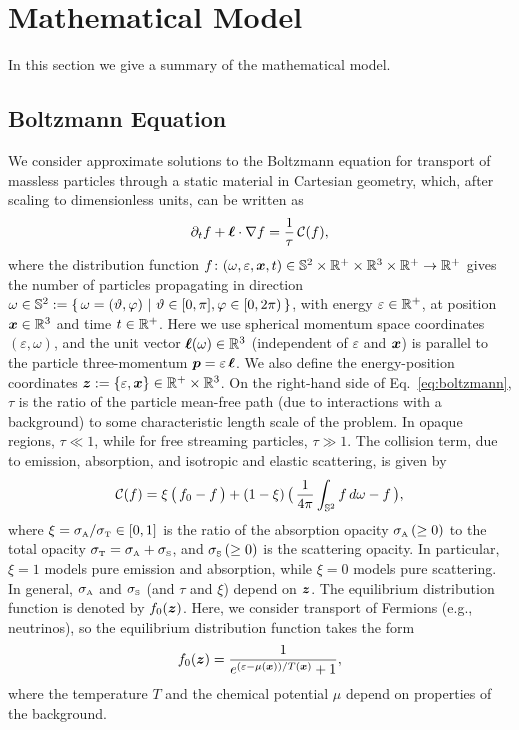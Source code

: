 \section{Mathematical Model}

In this section we give a summary of the mathematical model.  

\subsection{Boltzmann Equation}

We consider approximate solutions to the Boltzmann equation for transport of massless particles through a static material in Cartesian geometry, which, after scaling to dimensionless units, can be written as
\begin{equation}
  \pd{f}{t}+\vect{\ell}\cdot\nabla f
  =\f{1}{\tau}\,\cC(f),
  \label{eq:boltzmann}
\end{equation}
where the distribution function $f\colon(\omega,\varepsilon,\boldsymbol{x},t)\in\mathbb{S}^{2}\times\mathbb{R}^{+}\times\mathbb{R}^{3}\times\mathbb{R}^{+}\to\mathbb{R}^{+}$ gives the number of particles propagating in direction $\omega\in\mathbb{S}^{2}:=\{\,\omega=(\vartheta,\varphi)~|~\vartheta\in[0,\pi],\varphi\in[0,2\pi)\,\}$, with energy $\varepsilon\in\mathbb{R}^{+}$, at position $\boldsymbol{x}\in\mathbb{R}^{3}$ and time $t\in\mathbb{R}^{+}$.  
Here we use spherical momentum space coordinates $(\varepsilon,\omega)$, and the unit vector $\boldsymbol{\ell}(\omega)\in\mathbb{R}^{3}$ (independent of $\varepsilon$ and $\boldsymbol{x}$) is parallel to the particle three-momentum $\boldsymbol{p}=\varepsilon\,\boldsymbol{\ell}$.  
We also define the energy-position coordinates $\boldsymbol{z}:=\{\varepsilon,\boldsymbol{x}\}\in\mathbb{R}^{+}\times\mathbb{R}^{3}$.  
On the right-hand side of Eq.~\eqref{eq:boltzmann}, $\tau$ is the ratio of the particle mean-free path (due to interactions with a background) to some characteristic length scale of the problem.  
In opaque regions, $\tau\ll1$, while for free streaming particles, $\tau\gg1$.  
The collision term, due to emission, absorption, and isotropic and elastic scattering, is given by
\begin{equation}
  \cC(f)=\xi\,\big(\,f_{0}-f\,\big)
  +(1-\xi)\,\big(\,\f{1}{4\pi}\int_{\bbS^{2}}f\,d\omega-f\,\big),
  \label{eq:collisionTerm}
\end{equation}
where $\xi=\sigma_{\mbox{\tiny A}}/\sigma_{\mbox{\tiny T}}\in[0,1]$ is the ratio of the absorption opacity $\sigma_{\mbox{\tiny A}}\,(\ge0)$ to the total opacity $\sigma_{\mbox{\tiny T}}=\sigma_{\mbox{\tiny A}}+\sigma_{\mbox{\tiny S}}$, and $\sigma_{\mbox{\tiny S}}\,(\ge0)$ is the scattering opacity.  
In particular, $\xi=1$ models pure emission and absorption, while $\xi=0$ models pure scattering.  
In general, $\sigma_{\mbox{\tiny A}}$ and $\sigma_{\mbox{\tiny S}}$ (and $\tau$ and $\xi$) depend on $\boldsymbol{z}$.  
The equilibrium distribution function is denoted by $f_{0}(\boldsymbol{z})$.  
Here, we consider transport of Fermions (e.g., neutrinos), so the equilibrium distribution function takes the form
\begin{equation}
  f_{0}(\vect{z})=\f{1}{e^{(\varepsilon-\mu(\vect{x}))/T(\vect{x})}+1},  
  \label{eq:fermiDirac}
\end{equation}
where the temperature $T$ and the chemical potential $\mu$ depend on properties of the background.  


